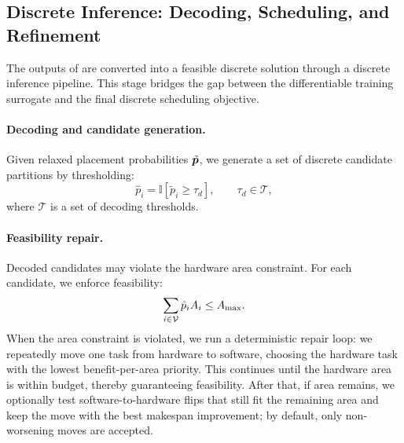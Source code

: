 \subsection{Discrete Inference: Decoding, Scheduling, and Refinement}
\label{subsec:inference}

The outputs of \diffgnn are converted into a feasible discrete solution through a discrete inference pipeline. This stage bridges the gap between the differentiable training surrogate and the final discrete scheduling objective.

\paragraph{\textbf{Decoding and candidate generation.}}
Given relaxed placement probabilities $\tilde{{\bm{p}}}$, we generate a set of discrete candidate partitions by thresholding:
\begin{equation}
\hat{p}_i = \mathbb{I}[\tilde{p}_i \ge \tau_d], \qquad \tau_d \in \mathcal{T},
\end{equation}
where $\mathcal{T}$ is a set of decoding thresholds.

\paragraph{\textbf{Feasibility repair.}}
Decoded candidates may violate the hardware area constraint. For each candidate, we enforce feasibility:
\begin{equation}
\sum_{i \in {\mathcal{V}}} \hat{p}_i A_i \le A_{\max}.
\end{equation}
When the area constraint is violated, we run a deterministic repair loop: we repeatedly move one task from hardware to software, choosing the hardware task with the lowest benefit-per-area priority. This continues until the hardware area is within budget, thereby guaranteeing feasibility. After that, if area remains, we optionally test software-to-hardware flips that still fit the remaining area and keep the move with the best makespan improvement; by default, only non-worsening moves are accepted.

